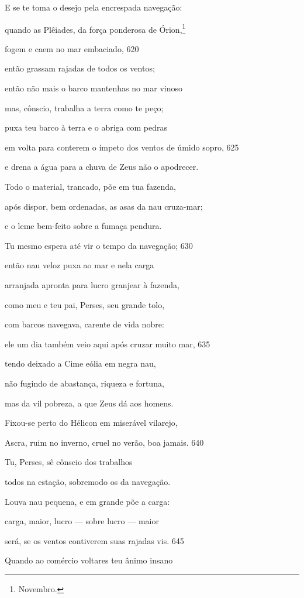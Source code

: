 E se te toma o desejo pela encrespada navegação:

quando as Plêiades, da força ponderosa de Órion,\footnote{Novembro.}

fogem e caem no mar embaciado, \num{620}

então grassam rajadas de todos os ventos;

então não mais o barco mantenhas no mar vinoso

mas, cônscio, trabalha a terra como te peço;

puxa teu barco à terra e o abriga com pedras

em volta para conterem o ímpeto dos ventos de úmido \qb{}sopro, \num{625}

e drena a água para a chuva de Zeus não o apodrecer.

Todo o material, trancado, põe em tua fazenda,

após dispor, bem ordenadas, as asas da nau cruza-mar;

e o leme bem-feito sobre a fumaça pendura.

Tu mesmo espera até vir o tempo da navegação; \num{630}

então nau veloz puxa ao mar e nela carga

arranjada apronta para lucro granjear à fazenda,

como meu e teu pai, Perses, seu grande tolo,

com barcos navegava, carente de vida nobre:

ele um dia também veio aqui após cruzar muito mar, \num{635}

tendo deixado a Cime eólia em negra nau,

não fugindo de abastança, riqueza e fortuna,

mas da vil pobreza, a que Zeus dá aos homens.

Fixou-se perto do Hélicon em miserável vilarejo,

Ascra, ruim no inverno, cruel no verão, boa jamais. \num{640}

Tu, Perses, sê cônscio dos trabalhos

todos na estação, sobremodo os da navegação.

Louva nau pequena, e em grande põe a carga:

carga, maior, lucro --- sobre lucro --- maior

será, se os ventos contiverem suas rajadas vis. \num{645}

Quando ao comércio voltares teu ânimo insano

